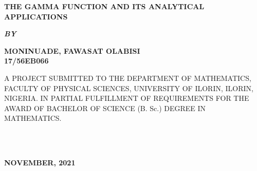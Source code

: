 \documentclass[11pt]{report}
\newcommand{\bt}[1]{\textbf{#1}}
\begin{document}
	
	\clearpage
	\thispagestyle{empty}
	\begin{center}
		\Large \bt{THE GAMMA FUNCTION AND ITS ANALYTICAL APPLICATIONS}
	\end{center}

	\hspace{7cm}
	
	\begin{center}
		\textbf{\textit{BY}}
	\end{center}
	
	\hspace{5cm}
	
	\begin{center}
		\large \textbf{MONINUADE, FAWASAT OLABISI
			\\
			17/56EB066}
	\end{center}
	
	\hspace{9cm}
	
	\begin{center}
		A PROJECT SUBMITTED TO THE DEPARTMENT OF MATHEMATICS, FACULTY OF PHYSICAL SCIENCES, UNIVERSITY OF ILORIN, ILORIN, NIGERIA. IN PARTIAL FULFILLMENT OF REQUIREMENTS FOR THE AWARD OF BACHELOR OF SCIENCE (B. Sc.) DEGREE IN MATHEMATICS.
	\end{center}

	\hspace{7cm}
~~~~
	\\ \\ 
	\begin{center}
		\textbf{NOVEMBER, 2021}
	\end{center}

	\newpage
\end{document}
